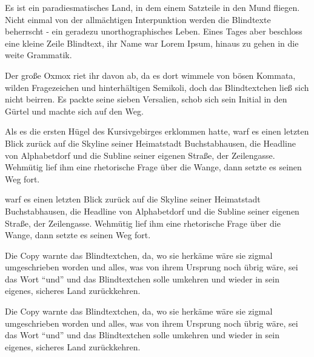 \documentclass[%
	12pt,%
	a4paper,%
	oneside,%
	liststotoc, idxtotoc, bibtotoc, %
	parskip=half,%
	nochapterprefix,%
	appendixprefix, %
	headings=small,%
]{scrreprt}
\begin{document}
					

Es ist ein paradiesmatisches Land, in dem einem  Satzteile in den Mund fliegen. Nicht einmal von der allmächtigen Interpunktion%
 werden die Blindtexte beherrscht - ein geradezu unorthographisches Leben. Eines Tages aber beschloss eine kleine Zeile Blindtext, ihr Name war Lorem Ipsum, hinaus zu gehen in die weite Grammatik.

Der große  Oxmox riet ihr davon ab, da es dort wimmele von bösen Kommata, wilden Fragezeichen und hinterhältigen Semikoli, doch das Blindtextchen ließ sich nicht beirren. Es packte seine sieben Versalien, schob sich sein Initial in den Gürtel und machte sich auf den Weg. 

Als es die ersten Hügel des Kursivgebirges erklommen  hatte, warf es einen letzten Blick zurück auf die Skyline seiner Heimatstadt Buchstabhausen, die Headline von Alphabetdorf und die Subline seiner  eigenen Straße, der Zeilengasse. Wehmütig lief ihm eine rhetorische Frage über die Wange, dann setzte es seinen  Weg fort.

warf es einen letzten Blick zurück auf die Skyline seiner Heimatstadt Buchstabhausen, die Headline von Alphabetdorf und die Subline seiner  eigenen Straße, der Zeilengasse. Wehmütig lief ihm eine rhetorische Frage über die Wange, dann setzte es seinen  Weg fort.

Die Copy warnte das \BGGshort Blindtextchen, da, wo sie herkäme wäre sie zigmal umgeschrieben worden und alles, was von ihrem Ursprung noch \BGGlong übrig wäre,  sei das Wort "`und"'  und das Blindtextchen solle umkehren und wieder in sein eigenes, sicheres Land  zurückkehren.

Die Copy warnte das \BITVshort Blindtextchen, da, wo sie herkäme wäre sie zigmal umgeschrieben worden und alles, was von ihrem Ursprung noch \BITVlong übrig wäre,  sei das Wort "`und"'  und das Blindtextchen solle umkehren und wieder in sein eigenes, sicheres Land  zurückkehren.
\end{document}
